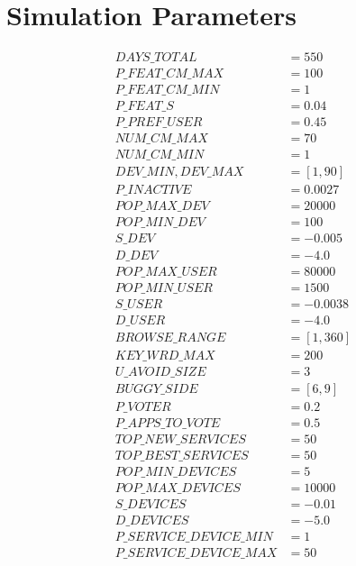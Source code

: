 
\chapter{Simulation Parameters}

\begin{equation}\label{list:simulation_params}
  \begin{aligned}
    DAYS\_TOTAL &= 550 \\
    P\_FEAT\_CM\_MAX &= 100 \\
    P\_FEAT\_CM\_MIN &= 1 \\
    P\_FEAT\_S      &= 0.04 \\
    P\_PREF\_USER   &= 0.45 \\
    NUM\_CM\_MAX &= 70 \\
    NUM\_CM\_MIN &= 1 \\
    DEV\_MIN, DEV\_MAX &= [1, 90] \\
    P\_INACTIVE &= 0.0027 \\
    POP\_MAX\_DEV &= 20000 \\
    POP\_MIN\_DEV &= 100 \\
    S\_DEV       &= -0.005 \\
    D\_DEV       &= -4.0 \\
    POP\_MAX\_USER &= 80000 \\
    POP\_MIN\_USER &= 1500 \\
    S\_USER       &= -0.0038 \\
    D\_USER       &= -4.0 \\
    BROWSE\_RANGE &= [1,360] \\
    KEY\_WRD\_MAX  &= 200 \\
    U\_AVOID\_SIZE &= 3 \\
    BUGGY\_SIDE     &= [6,9] \\
    P\_VOTER        &= 0.2 \\
    P\_APPS\_TO\_VOTE &= 0.5 \\
    TOP\_NEW\_SERVICES  &= 50 \\
    TOP\_BEST\_SERVICES &= 50 \\
    POP\_MIN\_DEVICES &= 5 \\
    POP\_MAX\_DEVICES &= 10000 \\
    S\_DEVICES       &= -0.01 \\
    D\_DEVICES       &= -5.0 \\
    P\_SERVICE\_DEVICE\_MIN &= 1 \\
    P\_SERVICE\_DEVICE\_MAX &= 50
  \end{aligned}
\end{equation}

\restoregeometry